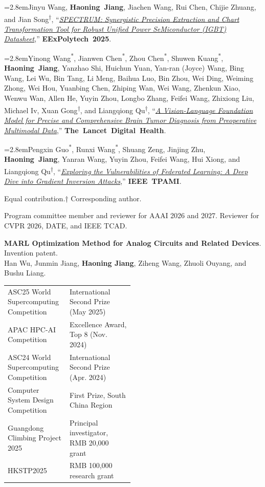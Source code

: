 \documentclass[10pt,a4paper]{article}
\newcommand{\heading}[1]{\par\addvspace{9pt}{\bfseries\underline{\MakeUppercase{#1}}}\par\nopagebreak\vspace{2pt}}
\newcommand{\me}{\textbf{Haoning~Jiang}}
\newcommand{\cor}{\textsuperscript{†}}
\newcommand{\equal}{\textsuperscript{*}}
\newcommand{\paper}[4]{%
  \par\addvspace{7pt}%
  {\raggedright\hangindent=2.8em\noindent\makebox[2.8em][l]{[#1]}#2, “\textit{#3},” \mbox{\textbf{#4}}.\par}}
\begin{document}
\paper{C.11}{Jinyu Wang, \me, Jiachen Wang, Rui Chen, Chijie Zhuang, and Jian Song\cor}{\href{https://ieeexplore.ieee.org/document/11252000}{SPECTRUM: Synergistic Precision Extraction and Chart Transformation Tool for Robust Unified Power SeMiconductor (IGBT) Datasheet}}{EExPolytech 2025}
\paper{J.1}{Yinong Wang\equal, Jianwen Chen\equal, Zhou Chen\equal, Shuwen Kuang\equal, \me, Yanzhao Shi, Huichun Yuan, Yan-ran (Joyce) Wang, Bing Wang, Lei Wu, Bin Tang, Li Meng, Baihua Luo, Bin Zhou, Wei Ding, Weiming Zhong, Wei Hou, Yuanbing Chen, Zhiping Wan, Wei Wang, Zhenkun Xiao, Wenwu Wan, Allen He, Yuyin Zhou, Longbo Zhang, Feifei Wang, Zhixiong Liu, Michael Iv, Xuan Gong\cor, and Liangqiong Qu\cor}{\href{https://arxiv.org/abs/2609.16597}{A Vision-Language Foundation Model for Precise and Comprehensive Brain Tumor Diagnosis from Preoperative Multimodal Data}}{The Lancet Digital Health}
\paper{J.2}{Pengxin Guo\equal, Runxi Wang\equal, Shuang Zeng, Jinjing Zhu, \me, Yanran Wang, Yuyin Zhou, Feifei Wang, Hui Xiong, and Liangqiong Qu\cor}{\href{https://arxiv.org/abs/2503.11514}{Exploring the Vulnerabilities of Federated Learning: A Deep Dive into Gradient Inversion Attacks}}{IEEE TPAMI}
{\small * Equal contribution.\quad † Corresponding author.}\par
\heading{Service}
Program committee member and reviewer for AAAI 2026 and 2027. Reviewer for CVPR 2026, DATE, and IEEE TCAD.
\heading{Patent}
\textbf{MARL Optimization Method for Analog Circuits and Related Devices}. Invention patent.\\
Han Wu, Junmin Jiang, \textbf{Haoning Jiang}, Ziheng Wang, Zhuoli Ouyang, and Bushu Liang.
\heading{Awards \& funding}
\renewcommand{\arraystretch}{1.17}
\begin{tabular}{@{}p{0.49\linewidth}@{}l@{}}
ASC25 World Supercomputing Competition & International Second Prize (May 2025)\\
APAC HPC-AI Competition & Excellence Award, Top 8 (Nov. 2024)\\
ASC24 World Supercomputing Competition & International Second Prize (Apr. 2024)\\
Computer System Design Competition & First Prize, South China Region\\
Guangdong Climbing Project 2025 & Principal investigator, RMB 20,000 grant\\
HKSTP2025 & RMB 100,000 research grant
\end{tabular}
\end{document}
